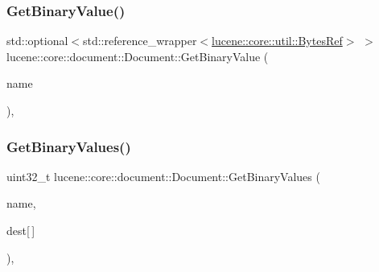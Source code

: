 \mbox{\label{classlucene_1_1core_1_1document_1_1Document_a3ec2c17e86ca5895821fb03f155c9d50}} 
\subsubsection{\texorpdfstring{Get\+Binary\+Value()}{GetBinaryValue()}}
{\footnotesize\ttfamily std\+::optional$<$std\+::reference\+\_\+wrapper$<$\mbox{\hyperlink{classlucene_1_1core_1_1util_1_1BytesRef}{lucene\+::core\+::util\+::\+Bytes\+Ref}}$>$ $>$ lucene\+::core\+::document\+::\+Document\+::\+Get\+Binary\+Value (\begin{DoxyParamCaption}\item[{\mbox{\hyperlink{ZlibCrc32_8h_a2c212835823e3c54a8ab6d95c652660e}{const}} std\+::string \&}]{name }\end{DoxyParamCaption})\hspace{0.3cm}{\ttfamily [inline]}, {\ttfamily [noexcept]}}

\mbox{\label{classlucene_1_1core_1_1document_1_1Document_aa701ba52228c5faefba171031137a903}} 
\subsubsection{\texorpdfstring{Get\+Binary\+Values()}{GetBinaryValues()}}
{\footnotesize\ttfamily uint32\+\_\+t lucene\+::core\+::document\+::\+Document\+::\+Get\+Binary\+Values (\begin{DoxyParamCaption}\item[{\mbox{\hyperlink{ZlibCrc32_8h_a2c212835823e3c54a8ab6d95c652660e}{const}} std\+::string \&}]{name,  }\item[{\mbox{\hyperlink{classlucene_1_1core_1_1util_1_1BytesRef}{lucene\+::core\+::util\+::\+Bytes\+Ref}} $\ast$}]{dest\mbox{[}$\,$\mbox{]} }\end{DoxyParamCaption})\hspace{0.3cm}{\ttfamily [inline]}, {\ttfamily [noexcept]}}


